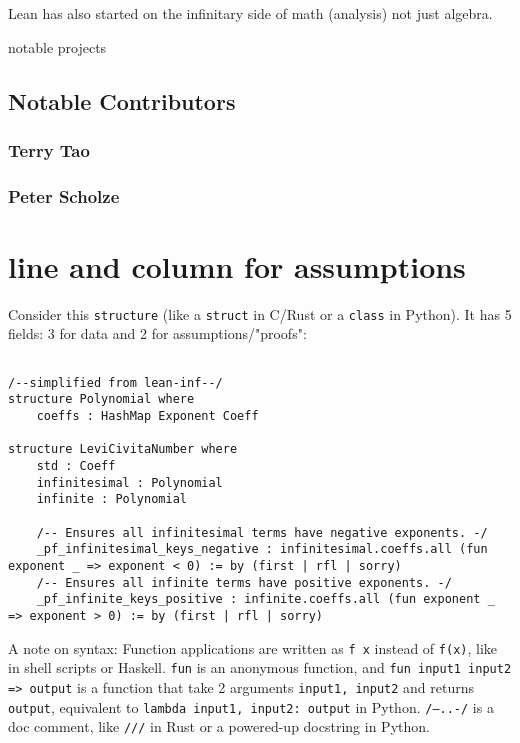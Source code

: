 \documentclass{article}
\begin{document}
Lean has also started on the infinitary side of math (analysis) not just algebra.

notable projects


\subsection{Notable Contributors}
\subsubsection{Terry Tao}

\subsubsection{Peter Scholze}

\section{line and column for assumptions}

Consider this \texttt{structure} (like a \texttt{struct} in C/Rust or a \texttt{class} in Python). It has 5 fields: 3 for data and 2 for assumptions/"proofs":

\begin{verbatim}

/--simplified from lean-inf--/
structure Polynomial where
    coeffs : HashMap Exponent Coeff

structure LeviCivitaNumber where
    std : Coeff
    infinitesimal : Polynomial
    infinite : Polynomial

    /-- Ensures all infinitesimal terms have negative exponents. -/
    _pf_infinitesimal_keys_negative : infinitesimal.coeffs.all (fun exponent _ => exponent < 0) := by (first | rfl | sorry)
    /-- Ensures all infinite terms have positive exponents. -/
    _pf_infinite_keys_positive : infinite.coeffs.all (fun exponent _ => exponent > 0) := by (first | rfl | sorry)
\end{verbatim}

A note on syntax: Function applications are written as \texttt{f x} instead of \texttt{f(x)}, like in shell scripts or Haskell. \texttt{fun} is an anonymous function, and \texttt{fun input1 input2 => output} is a function that take 2 arguments \texttt{input1, input2} and returns \texttt{output}, equivalent to \texttt{lambda input1, input2: output} in Python. \texttt{/--..-/} is a doc comment, like \texttt{///} in Rust or a powered-up docstring in Python.
\end{document}
